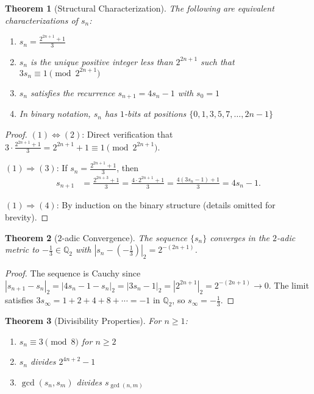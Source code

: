 \documentclass[11pt]{article}
\newtheorem{theorem}{Theorem}[section]
\theoremstyle{definition}
\newcommand{\Q}{\mathbb{Q}}
\begin{document}
\begin{theorem}[Structural Characterization]\label{thm:structural}
The following are equivalent characterizations of $s_n$:
\begin{enumerate}
\item $s_n = \frac{2^{2n+1} + 1}{3}$
\item $s_n$ is the unique positive integer less than $2^{2n+1}$ such that $3s_n \equiv 1 \pmod{2^{2n+1}}$
\item $s_n$ satisfies the recurrence $s_{n+1} = 4s_n - 1$ with $s_0 = 1$
\item In binary notation, $s_n$ has $1$-bits at positions $\{0, 1, 3, 5, 7, \ldots, 2n-1\}$
\end{enumerate}
\end{theorem}

\begin{proof}
$(1) \Leftrightarrow (2)$: Direct verification that $3 \cdot \frac{2^{2n+1} + 1}{3} = 2^{2n+1} + 1 \equiv 1 \pmod{2^{2n+1}}$.

$(1) \Rightarrow (3)$: If $s_n = \frac{2^{2n+1} + 1}{3}$, then
\begin{align}
s_{n+1} &= \frac{2^{2n+3} + 1}{3} = \frac{4 \cdot 2^{2n+1} + 1}{3} = \frac{4(3s_n - 1) + 1}{3} = 4s_n - 1.
\end{align}

$(1) \Rightarrow (4)$: By induction on the binary structure (details omitted for brevity).
\end{proof}

\begin{theorem}[$2$-adic Convergence]\label{thm:2adic}
The sequence $\{s_n\}$ converges in the $2$-adic metric to $-\frac{1}{3} \in \Q_2$ with $|s_n - (-\frac{1}{3})|_2 = 2^{-(2n+1)}$.
\end{theorem}

\begin{proof}
The sequence is Cauchy since $|s_{n+1} - s_n|_2 = |4s_n - 1 - s_n|_2 = |3s_n - 1|_2 = |2^{2n+1}|_2 = 2^{-(2n+1)} \to 0$. The limit satisfies $3s_\infty = 1 + 2 + 4 + 8 + \cdots = -1$ in $\Q_2$, so $s_\infty = -\frac{1}{3}$.
\end{proof}

\begin{theorem}[Divisibility Properties]\label{thm:divisibility}
For $n \geq 1$:
\begin{enumerate}
\item $s_n \equiv 3 \pmod{8}$ for $n \geq 2$
\item $s_n$ divides $2^{4n+2} - 1$
\item $\gcd(s_n, s_m)$ divides $s_{\gcd(n,m)}$
\end{enumerate}
\end{theorem}
\end{document}
